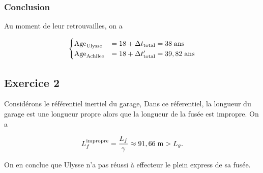 \documentclass[french]{article}
\begin{document}
	\subsubsection*{Conclusion}
	
	Au moment de leur retrouvailles, on a
	
	\begin{align}
		\begin{cases}
		\mathrm{Age}_{\mathrm{Ulysse}} &= 18 + \Delta t_{\mathrm{total}} = 38 \hspace{0.1cm} \mathrm{ans} \\
		\mathrm{Age}_{\mathrm{Achilee}} &= 18 + \Delta t'_{\mathrm{total}} = 39,82 \hspace{0.1cm} \mathrm{ans} 
		\end{cases}
	\end{align}
	
	\subsection*{Exercice 2}
	
	Considérons le référentiel inertiel du garage, Dans ce réferentiel, la longueur du garage est une longueur propre alors que la longueur de la fusée est impropre. On a
	
	\begin{equation}
		L_f^{\mathrm{impropre}} = \frac{L_f}{\gamma} \approx 91,66 \hspace{0.1cm} \mathrm{m} > L_g.
	\end{equation}
	
	On en conclue que Ulysse n'a pas réussi à effecteur le plein express de sa fusée.
	
\end{document}
